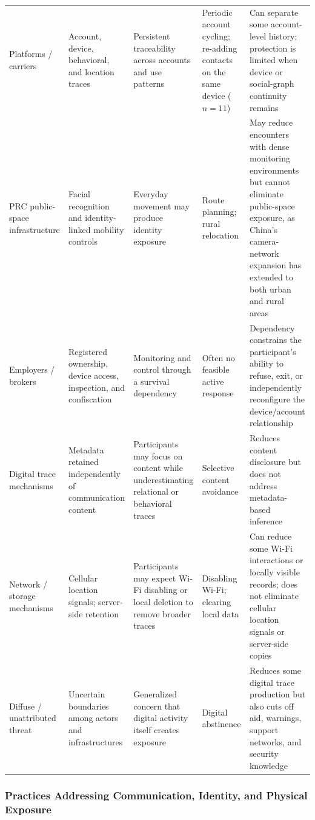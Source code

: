 \documentclass[conference,compsoc]{IEEEtran}
\begin{document}
\begin{table}[t]
{\begin{tabular}{@{}p{2.4cm}p{4.1cm}p{4.2cm}p{4.4cm}p{5.8cm}@{}}
Platforms / carriers & Account, device, behavioral, and location traces & Persistent traceability across accounts and use patterns & Periodic account cycling; re-adding contacts on the same device ($n=11$) & Can separate some account-level history; protection is limited when device or social-graph continuity remains~\cite{narayanan2009anonymizing} \\
PRC public-space infrastructure & Facial recognition and identity-linked mobility controls & Everyday movement may produce identity exposure & Route planning; rural relocation & May reduce encounters with dense monitoring environments but cannot eliminate public-space exposure, as China's camera-network expansion has extended to both urban and rural areas~\cite{ma2026keeping} \\
Employers / brokers & Registered ownership, device access, inspection, and confiscation & Monitoring and control through a survival dependency & Often no feasible active response & Dependency constrains the participant's ability to refuse, exit, or independently reconfigure the device/account relationship \\
\midrule
Digital trace mechanisms & Metadata retained independently of communication content & Participants may focus on content while underestimating relational or behavioral traces & Selective content avoidance & Reduces content disclosure but does not address metadata-based inference~\cite{mayer2016evaluating} \\
Network / storage mechanisms & Cellular location signals; server-side retention & Participants may expect Wi-Fi disabling or local deletion to remove broader traces & Disabling Wi-Fi; clearing local data & Can reduce some Wi-Fi interactions or locally visible records; does not eliminate cellular location signals or server-side copies~\cite{tomasin2021location} \\
Diffuse / unattributed threat & Uncertain boundaries among actors and infrastructures & Generalized concern that digital activity itself creates exposure & Digital abstinence & Reduces some digital trace production but also cuts off aid, warnings, support networks, and security knowledge \\
\bottomrule
\end{tabular}%
}
\end{table}

\subsubsection{Practices Addressing Communication, Identity, and Physical Exposure}
\label{subsubsec:concrete}
\end{document}
